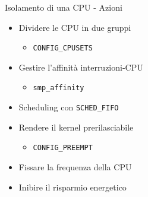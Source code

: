 \begin{frame}{Isolamento di una CPU - Azioni}
	\begin{itemize}
		\item Dividere le CPU in due gruppi
		\begin{itemize}
			\item \texttt{CONFIG\_CPUSETS}
		\end{itemize}
		\item Gestire l'affinità interruzioni-CPU 
		\begin{itemize}
			\item \texttt{smp\_affinity}
		\end{itemize}
		\item Scheduling con \texttt{SCHED\_FIFO}
		\item Rendere il kernel prerilasciabile 
		\begin{itemize}
			\item \texttt{CONFIG\_PREEMPT}
		\end{itemize}
		\item Fissare la frequenza della CPU
		\item Inibire il risparmio energetico
	\end{itemize}
\end{frame}